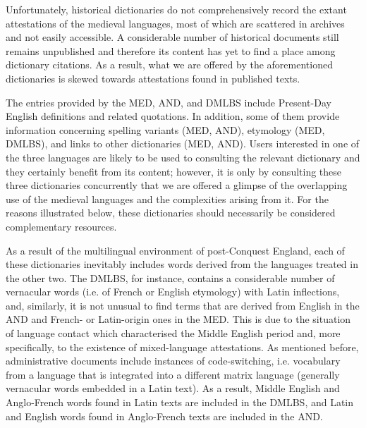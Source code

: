\documentclass[output=paper,colorlinks,citecolor=brown,arabicfont,chinesefont]{langscibook}
\begin{document}
Unfortunately, historical dictionaries do not comprehensively record the extant attestations of the medieval languages, most of which are scattered in archives and not easily accessible. A considerable number of historical documents still remains unpublished and therefore its content has yet to find a place among dictionary citations. As a result, what we are offered by the aforementioned dictionaries is skewed towards attestations found in published texts.

The entries provided by the MED, AND, and DMLBS include Present-Day English definitions and related quotations. In addition, some of them provide information concerning spelling variants (MED, AND), etymology (MED, DMLBS), and links to other dictionaries (MED, AND). Users interested in one of the three languages are likely to be used to consulting the relevant dictionary and they certainly benefit from its content; however, it is only by consulting these three dictionaries concurrently that we are offered a glimpse of the overlapping use of the medieval languages and the complexities arising from it. For the reasons illustrated below, these dictionaries should necessarily be considered complementary resources. 

As a result of the multilingual environment of post-Conquest England, each of these dictionaries inevitably includes words derived from the languages treated in the other two. The DMLBS, for instance, contains a considerable number of vernacular words (i.e. of French or English etymology) with Latin inflections, and, similarly, it is not unusual to find terms that are derived from English in the AND and French- or Latin-origin ones in the MED. This is due to the situation of language contact which characterised the Middle English period and, more specifically, to the existence of mixed-language attestations. As mentioned before, administrative documents include instances of code-switching, i.e. vocabulary from a language that is integrated into a different matrix language (generally vernacular words embedded in a Latin text). As a result, Middle English and Anglo-French words found in Latin texts are included in the DMLBS, and Latin and English words found in Anglo-French texts are included in the AND. 
\end{document}
